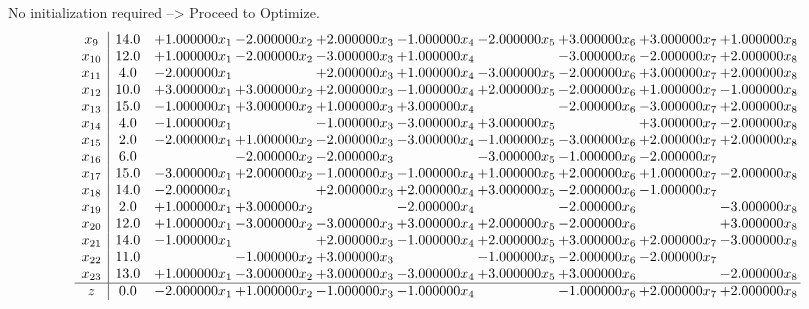 \documentclass[10pt]{article}
\begin{document}
No initialization required --> Proceed to Optimize. 
\[\begin{array}{c| c c@{\hskip 2pt} c@{\hskip 2pt} c@{\hskip 2pt} c@{\hskip 2pt} c@{\hskip 2pt} c@{\hskip 2pt} c@{\hskip 2pt} c@{\hskip 2pt} }
 x_{9}   &  14.0 & + 1.000000 x_{1} & -2.000000 x_{2} & + 2.000000 x_{3} & -1.000000 x_{4} & -2.000000 x_{5} & + 3.000000 x_{6} & + 3.000000 x_{7} & + 1.000000 x_{8}\\
 x_{10}   &  12.0 & + 1.000000 x_{1} & -2.000000 x_{2} & -3.000000 x_{3} & + 1.000000 x_{4} &   & -3.000000 x_{6} & -2.000000 x_{7} & + 2.000000 x_{8}\\
 x_{11}   &  4.0 & -2.000000 x_{1} &   & + 2.000000 x_{3} & + 1.000000 x_{4} & -3.000000 x_{5} & -2.000000 x_{6} & + 3.000000 x_{7} & + 2.000000 x_{8}\\
 x_{12}   &  10.0 & + 3.000000 x_{1} & + 3.000000 x_{2} & + 2.000000 x_{3} & -1.000000 x_{4} & + 2.000000 x_{5} & -2.000000 x_{6} & + 1.000000 x_{7} & -1.000000 x_{8}\\
 x_{13}   &  15.0 & -1.000000 x_{1} & + 3.000000 x_{2} & + 1.000000 x_{3} & + 3.000000 x_{4} &   & -2.000000 x_{6} & -3.000000 x_{7} & + 2.000000 x_{8}\\
 x_{14}   &  4.0 & -1.000000 x_{1} &   & -1.000000 x_{3} & -3.000000 x_{4} & + 3.000000 x_{5} &   & + 3.000000 x_{7} & -2.000000 x_{8}\\
 x_{15}   &  2.0 & -2.000000 x_{1} & + 1.000000 x_{2} & -2.000000 x_{3} & -3.000000 x_{4} & -1.000000 x_{5} & -3.000000 x_{6} & + 2.000000 x_{7} & + 2.000000 x_{8}\\
 x_{16}   &  6.0  &   & -2.000000 x_{2} & -2.000000 x_{3} &   & -3.000000 x_{5} & -1.000000 x_{6} & -2.000000 x_{7} &   \\
 x_{17}   &  15.0 & -3.000000 x_{1} & + 2.000000 x_{2} & -1.000000 x_{3} & -1.000000 x_{4} & + 1.000000 x_{5} & + 2.000000 x_{6} & + 1.000000 x_{7} & -2.000000 x_{8}\\
 x_{18}   &  14.0 & -2.000000 x_{1} &   & + 2.000000 x_{3} & + 2.000000 x_{4} & + 3.000000 x_{5} & -2.000000 x_{6} & -1.000000 x_{7} &   \\
 x_{19}   &  2.0 & + 1.000000 x_{1} & + 3.000000 x_{2} &   & -2.000000 x_{4} &   & -2.000000 x_{6} &   & -3.000000 x_{8}\\
 x_{20}   &  12.0 & + 1.000000 x_{1} & -3.000000 x_{2} & -3.000000 x_{3} & + 3.000000 x_{4} & + 2.000000 x_{5} & -2.000000 x_{6} &   & + 3.000000 x_{8}\\
 x_{21}   &  14.0 & -1.000000 x_{1} &   & + 2.000000 x_{3} & -1.000000 x_{4} & + 2.000000 x_{5} & + 3.000000 x_{6} & + 2.000000 x_{7} & -3.000000 x_{8}\\
 x_{22}   &  11.0  &   & -1.000000 x_{2} & + 3.000000 x_{3} &   & -1.000000 x_{5} & -2.000000 x_{6} & -2.000000 x_{7} &   \\
 x_{23}   &  13.0 & + 1.000000 x_{1} & -3.000000 x_{2} & + 3.000000 x_{3} & -3.000000 x_{4} & + 3.000000 x_{5} & + 3.000000 x_{6} &   & -2.000000 x_{8}\\
\hline
z    &  0.0 & -2.000000 x_{1} & + 1.000000 x_{2} & -1.000000 x_{3} & -1.000000 x_{4} &   & -1.000000 x_{6} & + 2.000000 x_{7} & + 2.000000 x_{8}\\
\end{array}\]
\end{document}
